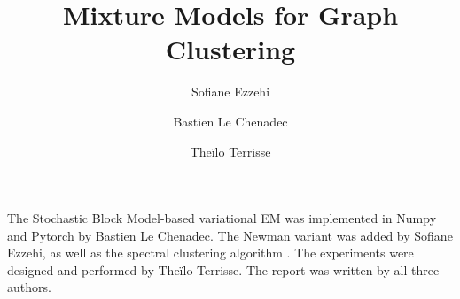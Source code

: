 \documentclass[switch, 12pt]{article}
\title{Mixture Models for Graph Clustering}
\author[1]{Sofiane Ezzehi}
\author[1]{Bastien Le Chenadec}
\author[1]{Theïlo Terrisse}
\affil[1]{École des Ponts ParisTech}
\begin{document}




\maketitle

\begin{contribstatement}
    The Stochastic Block Model-based variational EM \cite{main_article} was implemented in Numpy and Pytorch by Bastien Le Chenadec. The Newman variant \cite{newman} was added by Sofiane Ezzehi, as well as the spectral clustering algorithm \cite{spectral}. The experiments were designed and performed by Theïlo Terrisse. The report was written by all three authors.
\end{contribstatement}
\vspace{0.35cm}
\end{document}
